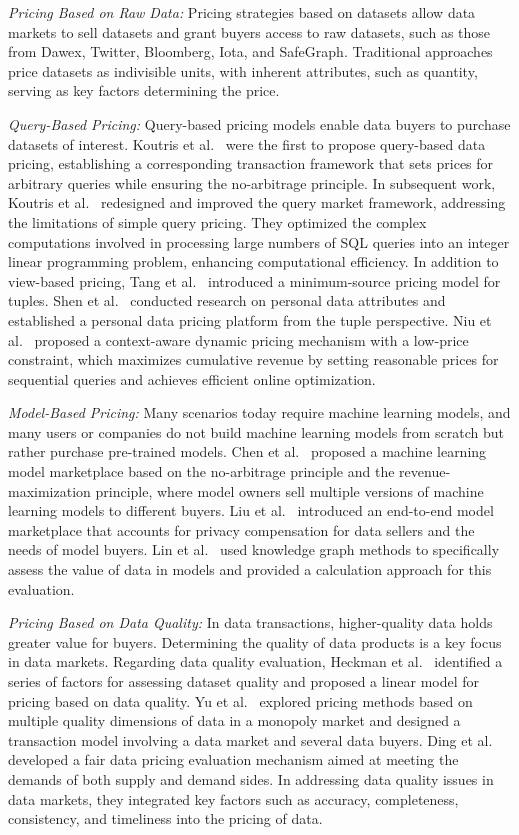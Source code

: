 \textit{Pricing Based on Raw Data:} 
Pricing strategies based on datasets allow data markets to sell datasets and grant buyers access to raw datasets, such as those from Dawex, Twitter, Bloomberg, Iota, and SafeGraph. Traditional approaches price datasets as indivisible units, with inherent attributes, such as quantity, serving as key factors determining the price.

\textit{Query-Based Pricing:} 
Query-based pricing models enable data buyers to purchase datasets of interest. Koutris et al.~\cite{ref27} were the first to propose query-based data pricing, establishing a corresponding transaction framework that sets prices for arbitrary queries while ensuring the no-arbitrage principle. In subsequent work, Koutris et al.~\cite{ref18} redesigned and improved the query market framework, addressing the limitations of simple query pricing. They optimized the complex computations involved in processing large numbers of SQL queries into an integer linear programming problem, enhancing computational efficiency. In addition to view-based pricing, Tang et al.~\cite{ref28} introduced a minimum-source pricing model for tuples. Shen et al.~\cite{ref29} conducted research on personal data attributes and established a personal data pricing platform from the tuple perspective. Niu et al.~\cite{ref66} proposed a context-aware dynamic pricing mechanism with a low-price constraint, which maximizes cumulative revenue by setting reasonable prices for sequential queries and achieves efficient online optimization.

\textit{Model-Based Pricing:} 
Many scenarios today require machine learning models, and many users or companies do not build machine learning models from scratch but rather purchase pre-trained models. Chen et al.~\cite{ref30} proposed a machine learning model marketplace based on the no-arbitrage principle and the revenue-maximization principle, where model owners sell multiple versions of machine learning models to different buyers. Liu et al.~\cite{ref31} introduced an end-to-end model marketplace that accounts for privacy compensation for data sellers and the needs of model buyers. Lin et al.~\cite{ref37} used knowledge graph methods to specifically assess the value of data in models and provided a calculation approach for this evaluation.

\textit{Pricing Based on Data Quality:} 
In data transactions, higher-quality data holds greater value for buyers. Determining the quality of data products is a key focus in data markets. Regarding data quality evaluation, Heckman et al.~\cite{ref32} identified a series of factors for assessing dataset quality and proposed a linear model for pricing based on data quality. Yu et al.~\cite{ref33} explored pricing methods based on multiple quality dimensions of data in a monopoly market and designed a transaction model involving a data market and several data buyers. Ding et al.~~\cite{ref63} developed a fair data pricing evaluation mechanism aimed at meeting the demands of both supply and demand sides. In addressing data quality issues in data markets, they integrated key factors such as accuracy, completeness, consistency, and timeliness into the pricing of data.

